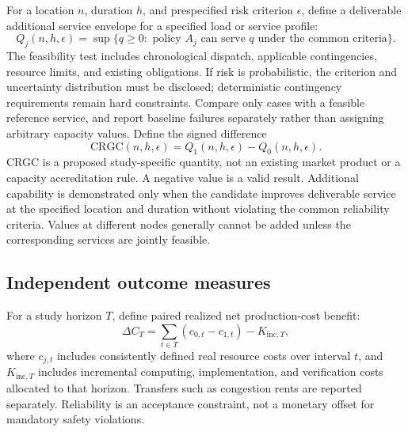 \documentclass[11pt,letterpaper]{article}
\newcommand{\CRGC}{\mathrm{CRGC}}
\begin{document}
For a location $n$, duration $h$, and prespecified risk criterion $\epsilon$, define a deliverable additional service envelope for a specified load or service profile:
\begin{equation}
Q_j(n,h,\epsilon)=\sup\{q\geq0:\text{ policy }A_j\text{ can serve }q
\text{ under the common criteria}\}.
\end{equation}
The feasibility test includes chronological dispatch, applicable contingencies, resource limits, and existing obligations. If risk is probabilistic, the criterion and uncertainty distribution must be disclosed; deterministic contingency requirements remain hard constraints. Compare only cases with a feasible reference service, and report baseline failures separately rather than assigning arbitrary capacity values. Define the signed difference
\begin{equation}
\boxed{\CRGC(n,h,\epsilon)=Q_1(n,h,\epsilon)-Q_0(n,h,\epsilon).}
\label{eq:crgc}
\end{equation}
CRGC is a proposed study-specific quantity, not an existing market product or a capacity accreditation rule. A negative value is a valid result. Additional capability is demonstrated only when the candidate improves deliverable service at the specified location and duration without violating the common reliability criteria. Values at different nodes generally cannot be added unless the corresponding services are jointly feasible.

\subsection{Independent outcome measures}
For a study horizon $T$, define paired realized net production-cost benefit:
\begin{equation}
\Delta C_T=\sum_{t\in T}(c_{0,t}-c_{1,t})-K_{\mathrm{inc},T},
\end{equation}
where $c_{j,t}$ includes consistently defined real resource costs over interval $t$, and $K_{\mathrm{inc},T}$ includes incremental computing, implementation, and verification costs allocated to that horizon. Transfers such as congestion rents are reported separately. Reliability is an acceptance constraint, not a monetary offset for mandatory safety violations.
\end{document}
